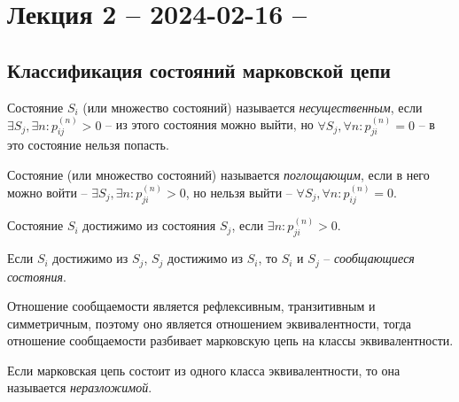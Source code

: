 \section{Лекция 2 -- 2024-02-16 -- }

\subsection{Классификация состояний марковской цепи}






\begin{definition}
  Состояние $S_i$ (или множество состояний) называется \emph{несущественным}, если
  $\exists S_j, \exists n : p_{ij}^{(n)} > 0$ -- из этого состояния можно выйти,
  но $\forall S_j, \forall n : p_{ji}^{(n)} = 0$ -- в это состояние нельзя попасть.
\end{definition}

\begin{definition}
  Состояние (или множество состояний) называется \emph{поглощающим}, если в него можно войти --
  $\exists S_j , \exists n : p_{ji}^{(n)} > 0$,
  но нельзя выйти --
  $\forall S_j, \forall n : p_{ij}^{(n)} = 0$.
\end{definition}

\begin{definition}
  Состояние $S_i$ достижимо из состояния $S_j$, если $\exists n : p_{ji}^{(n)} > 0$.
\end{definition}

\begin{definition}
  Если $S_i$ достижимо из $S_j$, $S_j$ достижимо из $S_i$, то $S_i$ и $S_j$ -- \emph{сообщающиеся
  состояния}.
\end{definition}

Отношение сообщаемости является рефлексивным, транзитивным и симметричным, поэтому оно является 
отношением эквивалентности, тогда отношение сообщаемости разбивает марковскую цепь на классы эквивалентности.

\begin{definition}
  Если марковская цепь состоит из одного класса эквивалентности, то она называется
  \emph{неразложимой}.
\end{definition}

